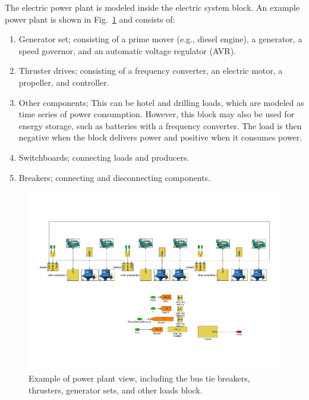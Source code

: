\documentclass[journal]{IEEEtran}
\begin{document}
The electric power plant is modeled inside the electric system block.
An example power plant is shown in Fig.~\ref{fig:PowerPlantsscheme} and consists of:
\begin{enumerate}
\item Generator set; consisting of a prime mover (e.g., diesel engine), a generator, a speed governor, and an automatic voltage regulator (AVR).
\item Thruster drives; consisting of a frequency converter, an electric motor, a propeller, and controller.
\item Other components; This can be hotel and drilling loads, which are modeled as time series of power consumption. However, this block may also be used for energy storage, such as batteries with a frequency converter. The load is then negative when the block delivers power and positive when it consumes power.
\item Switchboards; connecting loads and producers.
\item Breakers; connecting and disconnecting components.
\end{enumerate}


\begin{figure}[t!]
\centering
\includegraphics[trim=30 280 30 80,width=\textwidth,clip]{./figures/elscheme.pdf}
\caption{Example of power plant view, including the bus tie breakers, thrusters, generator sets, and other loads block. }
\label{fig:PowerPlantsscheme}
\end{figure}
\end{document}
